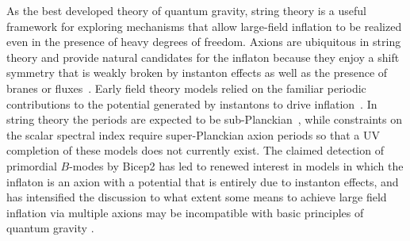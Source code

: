 As the best developed theory of quantum gravity, string theory is a useful framework for exploring mechanisms that allow large-field inflation to be realized even in the presence of heavy degrees of freedom. Axions are ubiquitous in string theory and provide natural candidates for the inflaton because they enjoy a shift symmetry that is weakly broken by instanton effects as well as the presence of branes or fluxes~\cite{Wen:1985jz}. Early field theory models relied on the familiar periodic contributions to the potential generated by instantons to drive inflation~\cite{Freese:1990rb,Adams:1992bn}. In string theory the periods are expected to be sub-Planckian~\cite{Banks:2003sx,ArkaniHamed:2006dz}, while constraints on the scalar spectral index require super-Planckian axion periods so that a UV completion of these models does not currently exist. The claimed detection of primordial $B$-modes by {\sc Bicep}2 has led to renewed interest in models in which the inflaton is an axion with a potential that is entirely due to instanton effects, and has intensified the discussion to what extent some means to achieve large field inflation via multiple axions may be incompatible with basic principles of quantum gravity \cite{Kim:2004rp,Rudelius:2014wla,delaFuente:2014aca,Rudelius:2015xta,Brown:2015iha,Bachlechner:2015qja,Brown:2015lia,Heidenreich:2015wga,Heidenreich:2015nta,Kooner:2015rza}.



